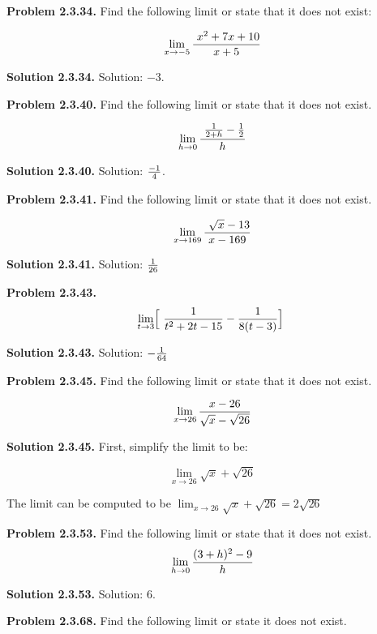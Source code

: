 \def\problem#1{{\bf Problem #1.}}
\def\solution#1{{\bf Solution #1.}}
\parindent=0pt
\pdfpagewidth=148mm
\pdfpageheight=210mm
\hsize=128mm
\vsize=190mm
\pdfhorigin=0pt
\pdfvorigin=0pt
\hoffset=10mm
\voffset=10mm

\problem{2.3.34}
Find the following limit or state that it does not exist:

$$\
\lim_{x \to -5} {\
{x^2 + 7x + 10}
\over
{x + 5}
}
$$


\solution{2.3.34}
Solution: $-3$.

\bigskip

\problem{2.3.40}
Find the following limit or state that it does
not exist.

$$\
\lim_{h \to 0} {\
{{1 \over 2 + h} - {1 \over 2}} \over h
}
$$

\solution{2.3.40}
Solution: $-1 \over 4$.

\bigskip

\problem{2.3.41}
Find the following limit or state that it does not exist.

$$\
\lim_{x \to 169} {\
{\sqrt{x} - 13}
\over
{x - 169}
}
$$

\solution{2.3.41}
Solution: ${1 \over 26}$

\bigskip

\problem{2.3.43}
$$\lim_{t \to 3} \Bigl[ {\
{1
\over
t^2 + 2t - 15}
-
{1 \over 8(t - 3)}
}\Bigr]
$$

\solution{2.3.43}
Solution: $-{1 \over 64}$

\bigskip

\problem{2.3.45}
Find the following limit or state that it does not exist.

$$\
\lim_{x \to 26} {
{x - 26}
\over
{\sqrt{x} - \sqrt{26}}
}
$$

\solution{2.3.45}
First, simplify the limit to be:

$$\
\lim_{x \to 26} {
\sqrt{x} + \sqrt{26}
}
$$

The limit can be computed to be
$\lim_{x \to 26} {\sqrt{x} + \sqrt{26}} = 2 \sqrt{26}$

\bigskip

\problem{2.3.53}
Find the following limit or state that it does not exist.
$$\
\lim_{h \to 0}{
(3 + h)^2 - 9
\over
h
}
$$

\solution{2.3.53}
Solution: $6$.

\bigskip

\problem{2.3.68}
Find the following limit or state it does not exist.

